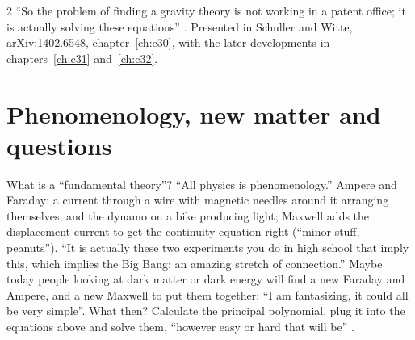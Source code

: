 \begin{paracol}{2}
``So the problem of finding a gravity theory is not working in a patent office; it is actually solving these equations'' . Presented in Schuller and Witte, arXiv:1402.6548, chapter~\ref{ch:c30}, with the later developments in chapters~\ref{ch:c31} and~\ref{ch:c32}.

\section{Phenomenology, new matter and questions}\label{sec:c26-pheno}

What is a ``fundamental theory''? ``All physics is phenomenology.'' Ampere and Faraday: a current through a wire with magnetic needles around it arranging themselves, and the dynamo on a bike producing light; Maxwell adds the displacement current to get the continuity equation right (``minor stuff, peanuts''). ``It is actually these two experiments you do in high school that imply this, which implies the Big Bang: an amazing stretch of connection.'' Maybe today people looking at dark matter or dark energy will find a new Faraday and Ampere, and a new Maxwell to put them together: ``I am fantasizing, it could all be very simple''. What then? Calculate the principal polynomial, plug it into the equations above and solve them, ``however easy or hard that will be'' .


\end{paracol}
